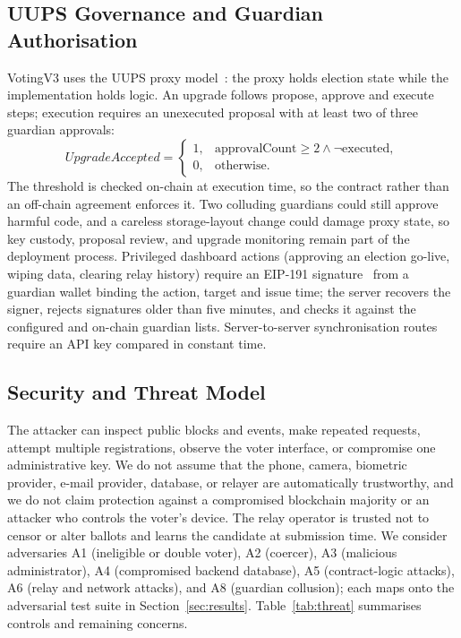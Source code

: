 \documentclass[conference]{IEEEtran}
\begin{document}
\subsection{UUPS Governance and Guardian Authorisation}
VotingV3 uses the UUPS proxy model~\cite{eip1822}: the proxy holds election state while the implementation holds logic. An upgrade follows propose, approve and execute steps; execution requires an unexecuted proposal with at least two of three guardian approvals:
\begin{equation}
\mathit{UpgradeAccepted} =
\begin{cases}
1, & \text{approvalCount} \geq 2 \wedge \neg\text{executed},\\
0, & \text{otherwise.}
\end{cases}
\label{eq:upgrade}
\end{equation}
The threshold is checked on-chain at execution time, so the contract rather than an off-chain agreement enforces it. Two colluding guardians could still approve harmful code, and a careless storage-layout change could damage proxy state, so key custody, proposal review, and upgrade monitoring remain part of the deployment process. Privileged dashboard actions (approving an election go-live, wiping data, clearing relay history) require an EIP-191 signature~\cite{eip191} from a guardian wallet binding the action, target and issue time; the server recovers the signer, rejects signatures older than five minutes, and checks it against the configured and on-chain guardian lists. Server-to-server synchronisation routes require an API key compared in constant time.

\subsection{Security and Threat Model}
The attacker can inspect public blocks and events, make repeated requests, attempt multiple registrations, observe the voter interface, or compromise one administrative key. We do not assume that the phone, camera, biometric provider, e-mail provider, database, or relayer are automatically trustworthy, and we do not claim protection against a compromised blockchain majority or an attacker who controls the voter's device. The relay operator is trusted not to censor or alter ballots and learns the candidate at submission time. We consider adversaries A1 (ineligible or double voter), A2 (coercer), A3 (malicious administrator), A4 (compromised backend database), A5 (contract-logic attacks), A6 (relay and network attacks), and A8 (guardian collusion); each maps onto the adversarial test suite in Section~\ref{sec:results}. Table~\ref{tab:threat} summarises controls and remaining concerns.
\end{document}
